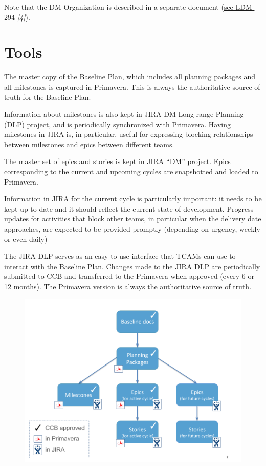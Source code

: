 \documentclass[DM,toc]{lsstdoc}
\newcommand{\sphinxcrossref}[1]{\emph{#1}}
\begin{document}
Note that the DM Organization is described in a separate document (\href{https://ls.st/LDM-294}{see LDM-294} \label{\detokenize{index:id10}}{\hyperref[\detokenize{index:ldm-294}]{\sphinxcrossref{{[}4{]}}}}).


\section{Tools}
\label{\detokenize{index:tools}}
The master copy of the Baseline Plan, which includes all planning packages and all milestones is captured
in Primavera. This is always the authoritative source of truth for the Baseline Plan.

Information about milestones is also kept in JIRA DM Long-range Planning (DLP) project, and is periodically
synchronized with Primavera. Having milestones in JIRA is, in particular, useful for expressing blocking
relationships between milestones and epics between different teams.

The master set of epics and stories is kept in JIRA ``DM'' project. Epics corresponding to the current
and upcoming cycles are snapshotted and loaded to Primavera.

Information in JIRA for the current cycle is particularly important: it needs to be
kept up-to-date and it should reflect the current state of development. Progress
updates for activities that block other teams, in particular when the delivery date
approaches, are expected to be provided promptly (depending on urgency, weekly or even daily)

The JIRA DLP serves as an easy-to-use interface that TCAMs can use to interact with
the Baseline Plan. Changes made to the JIRA DLP are periodically submitted to CCB
and transferred to the Primavera when approved (every 6 or 12 months). The Primavera
version is always the authoritative source of truth.

\begin{figure}
\includegraphics[width=\textwidth]{baselinePlanDiagram.png}
\end{figure}
\end{document}
